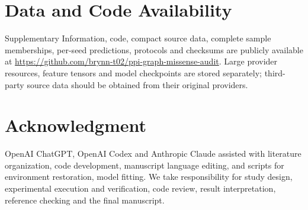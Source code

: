 \documentclass[conference]{IEEEtran}
\begin{document}
\section*{Data and Code Availability}

Supplementary Information, code, compact source data, complete sample memberships, per-seed predictions, protocols and checksums are publicly available at \url{https://github.com/brynn-t02/ppi-graph-missense-audit}. Large provider resources, feature tensors and model checkpoints are stored separately; third-party source data should be obtained from their original providers.

\section*{Acknowledgment}

OpenAI ChatGPT, OpenAI Codex and Anthropic Claude assisted with literature organization, code development, manuscript language editing, and scripts for environment restoration, model fitting. We take responsibility for study design, experimental execution and verification, code review, result interpretation, reference checking and the final manuscript.
\end{document}
